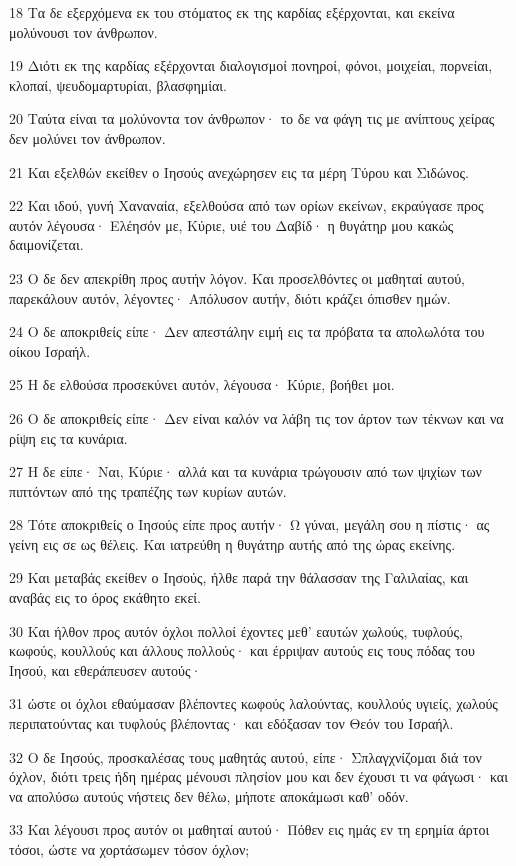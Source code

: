 \par 18 Τα δε εξερχόμενα εκ του στόματος εκ της καρδίας εξέρχονται, και εκείνα μολύνουσι τον άνθρωπον.
\par 19 Διότι εκ της καρδίας εξέρχονται διαλογισμοί πονηροί, φόνοι, μοιχείαι, πορνείαι, κλοπαί, ψευδομαρτυρίαι, βλασφημίαι.
\par 20 Ταύτα είναι τα μολύνοντα τον άνθρωπον· το δε να φάγη τις με ανίπτους χείρας δεν μολύνει τον άνθρωπον.
\par 21 Και εξελθών εκείθεν ο Ιησούς ανεχώρησεν εις τα μέρη Τύρου και Σιδώνος.
\par 22 Και ιδού, γυνή Χαναναία, εξελθούσα από των ορίων εκείνων, εκραύγασε προς αυτόν λέγουσα· Ελέησόν με, Κύριε, υιέ του Δαβίδ· η θυγάτηρ μου κακώς δαιμονίζεται.
\par 23 Ο δε δεν απεκρίθη προς αυτήν λόγον. Και προσελθόντες οι μαθηταί αυτού, παρεκάλουν αυτόν, λέγοντες· Απόλυσον αυτήν, διότι κράζει όπισθεν ημών.
\par 24 Ο δε αποκριθείς είπε· Δεν απεστάλην ειμή εις τα πρόβατα τα απολωλότα του οίκου Ισραήλ.
\par 25 Η δε ελθούσα προσεκύνει αυτόν, λέγουσα· Κύριε, βοήθει μοι.
\par 26 Ο δε αποκριθείς είπε· Δεν είναι καλόν να λάβη τις τον άρτον των τέκνων και να ρίψη εις τα κυνάρια.
\par 27 Η δε είπε· Ναι, Κύριε· αλλά και τα κυνάρια τρώγουσιν από των ψιχίων των πιπτόντων από της τραπέζης των κυρίων αυτών.
\par 28 Τότε αποκριθείς ο Ιησούς είπε προς αυτήν· Ω γύναι, μεγάλη σου η πίστις· ας γείνη εις σε ως θέλεις. Και ιατρεύθη η θυγάτηρ αυτής από της ώρας εκείνης.
\par 29 Και μεταβάς εκείθεν ο Ιησούς, ήλθε παρά την θάλασσαν της Γαλιλαίας, και αναβάς εις το όρος εκάθητο εκεί.
\par 30 Και ήλθον προς αυτόν όχλοι πολλοί έχοντες μεθ' εαυτών χωλούς, τυφλούς, κωφούς, κουλλούς και άλλους πολλούς· και έρριψαν αυτούς εις τους πόδας του Ιησού, και εθεράπευσεν αυτούς·
\par 31 ώστε οι όχλοι εθαύμασαν βλέποντες κωφούς λαλούντας, κουλλούς υγιείς, χωλούς περιπατούντας και τυφλούς βλέποντας· και εδόξασαν τον Θεόν του Ισραήλ.
\par 32 Ο δε Ιησούς, προσκαλέσας τους μαθητάς αυτού, είπε· Σπλαγχνίζομαι διά τον όχλον, διότι τρεις ήδη ημέρας μένουσι πλησίον μου και δεν έχουσι τι να φάγωσι· και να απολύσω αυτούς νήστεις δεν θέλω, μήποτε αποκάμωσι καθ' οδόν.
\par 33 Και λέγουσι προς αυτόν οι μαθηταί αυτού· Πόθεν εις ημάς εν τη ερημία άρτοι τόσοι, ώστε να χορτάσωμεν τόσον όχλον;
